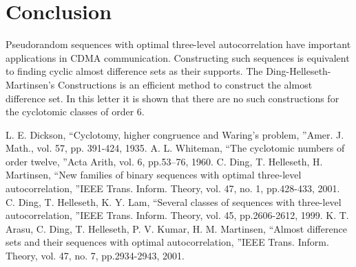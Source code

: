 \documentclass[letter]{ieice}
\begin{document}
\section{Conclusion}\label{sec 4}
Pseudorandom sequences with optimal three-level autocorrelation have important applications in CDMA communication. Constructing such sequences is equivalent to finding cyclic almost difference sets as their supports. The Ding-Helleseth-Martinsen’s Constructions is an efficient method to construct the almost difference set. In this letter it is shown that there are no such constructions for the cyclotomic classes of order 6.
\begin{thebibliography}{99}
L. E. Dickson, \textquotedblleft Cyclotomy, higher congruence and Waring's problem, \textquotedblright  Amer. J. Math., vol. 57, pp. 391-424, 1935.
A. L. Whiteman,  \textquotedblleft The cyclotomic numbers of order twelve, \textquotedblright  Acta Arith, vol. 6, pp.53–76, 1960.
C. Ding, T. Helleseth, H. Martinsen,  \textquotedblleft New families of binary sequences with optimal three-level autocorrelation, \textquotedblright IEEE Trans. Inform. Theory, vol. 47, no. 1, pp.428-433, 2001.
C. Ding, T. Helleseth, K. Y. Lam,  \textquotedblleft Several classes of sequences with three-level autocorrelation, \textquotedblright IEEE Trans. Inform. Theory, vol. 45, pp.2606-2612, 1999.
K. T. Arasu, C. Ding, T. Helleseth,  P. V. Kumar,   H. M. Martinsen, \textquotedblleft Almost difference sets and their sequences with optimal autocorrelation, \textquotedblright IEEE Trans. Inform. Theory, vol. 47, no. 7, pp.2934-2943, 2001.
\end{thebibliography}
\end{document}
